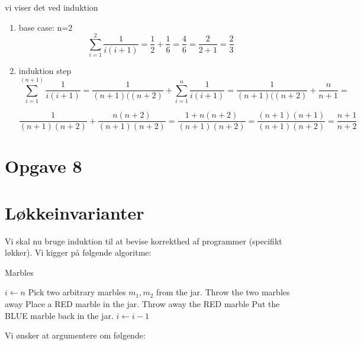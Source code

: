 \documentclass{article}
\theoremstyle{definition}
\begin{document}
\begin{enumerate}
     vi viser det ved induktion
    \begin{enumerate}
        \item base case: n=2
        \[ \sum_{i=1}^2 \frac{1}{i(i+1)} = \frac{1}{2}+\frac{1}{6} = \frac{4}{6} = \frac{2}{2+1}=\frac{2}{3}\]
        \item induktion step
        \[
        \sum_{i=1}^{(n+1)} \frac{1}{i(i+1)} =  \frac{1}{(n+1)((n+2)} + \sum_{i=1}^n \frac{1}{i(i+1)} = \frac{1}{(n+1)((n+2)} + \frac{n}{n+1} =\] 
        
        \[
        \frac{1}{(n+1)(n+2)} + \frac{n(n+2)}{(n+1)(n+2)} = \frac{1+n(n+2)}{(n+1)(n+2)} =  \frac{(n+1)(n+1)}{(n+1)(n+2)} = \frac{n+1}{n+2}
        \]
    \end{enumerate}
\end{enumerate}

\section{Opgave 8}
\section{Løkkeinvarianter}

Vi skal nu bruge induktion til at bevise korrekthed af programmer (specifikt løkker). Vi kigger på følgende algoritme:

\begin{algorithm}
\caption{Marbles}
\begin{algorithmic}[1]
\State $i \leftarrow n$
    \State Pick two arbitrary marbles $m_1, m_2$ from the jar.
        \State Throw the two marbles away
        \State Place a RED marble in the jar.
    \Else
        \State Throw away the RED marble
        \State Put the BLUE marble back in the jar.
    \EndIf
    \State $i \leftarrow i-1$
\EndWhile
\end{algorithmic}
\end{algorithm}

Vi ønsker at argumentere om følgende:
\end{document}

